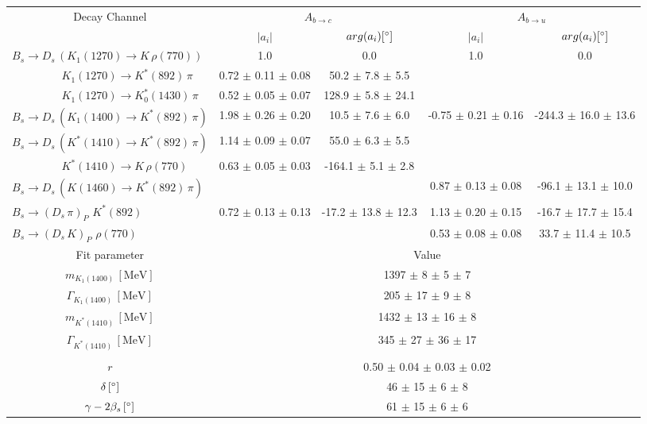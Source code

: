 \begin{tabular}{l c c c c } 
\hline
\hline
\multicolumn{1}{c}{Decay Channel} & \multicolumn{2}{c}{$A_{b \to c}$} & \multicolumn{2}{c}{$A_{b \to u}$}  \\ 
 & \multicolumn{1}{c}{$\vert a_i \vert$}  & \multicolumn{1}{c}{$arg(a_i) [^{\circ}]$}  & \multicolumn{1}{c}{$\vert a_i \vert$} & \multicolumn{1}{c}{$arg(a_i) [^{\circ}]$} \\ 
\hline
 $B_s \to D_s \, ( K_1(1270) \to K \, \rho(770) ) $ &  1.0 & 0.0 & 1.0 & 0.0  \\ 
$\phantom{B_s \to D_s \, (} K_1(1270) \to K^{*}(892) \, \pi \phantom{)} $ & 0.72 $\pm$ 0.11 $\pm$ 0.08 & 50.2 $\pm$ 7.8 $\pm$ 5.5 & &   \\ 
$\phantom{B_s \to D_s \, (} K_1(1270) \to K^{*}_{0}(1430) \, \pi \phantom{)} $ & 0.52 $\pm$ 0.05 $\pm$ 0.07 & 128.9 $\pm$ 5.8 $\pm$ 24.1 & &   \\ 
$B_s \to D_s \, ( K_1(1400) \to K^{*}(892) \, \pi ) $ & 1.98 $\pm$ 0.26 $\pm$ 0.20 & 10.5 $\pm$ 7.6 $\pm$ 6.0 & -0.75 $\pm$ 0.21 $\pm$ 0.16 & -244.3 $\pm$ 16.0 $\pm$ 13.6 \\ 
$B_s \to D_s \, ( K^{*}(1410) \to K^{*}(892) \, \pi ) $ & 1.14 $\pm$ 0.09 $\pm$ 0.07 & 55.0 $\pm$ 6.3 $\pm$ 5.5 &  &  \\ 
$\phantom{B_s \to D_s \, (} K^{*}(1410) \to K \, \rho(770) \phantom{)} $ & 0.63 $\pm$ 0.05 $\pm$ 0.03 & -164.1 $\pm$ 5.1 $\pm$ 2.8 & &   \\ 
$B_s \to D_s \, ( K(1460) \to K^{*}(892) \, \pi ) $ & & &0.87 $\pm$ 0.13 $\pm$ 0.08 & -96.1 $\pm$ 13.1 $\pm$ 10.0 \\ 
$B_s \to ( D_s \, \pi)_{P} \, \, K^{*}(892) $ & 0.72 $\pm$ 0.13 $\pm$ 0.13 & -17.2 $\pm$ 13.8 $\pm$ 12.3 & 1.13 $\pm$ 0.20 $\pm$ 0.15 & -16.7 $\pm$ 17.7 $\pm$ 15.4 \\ 
$B_s \to ( D_s \, K)_{P} \, \, \rho(770) $ & & &0.53 $\pm$ 0.08 $\pm$ 0.08 & 33.7 $\pm$ 11.4 $\pm$ 10.5 \\ 
\hline
\hline
\multicolumn{1}{c}{Fit parameter} & \multicolumn{4}{c}{Value}  \\ 
\hline
\multicolumn{1}{c}{$m_{K_1(1400)} \, [\text{MeV}]$} & \multicolumn{4}{c}{1397 $\pm$ 8 $\pm$ 5 $\pm$ 7} \\ 
\multicolumn{1}{c}{$\Gamma_{K_1(1400)} \, [\text{MeV}]$} & \multicolumn{4}{c}{205 $\pm$ 17 $\pm$ 9 $\pm$ 8} \\ 
\multicolumn{1}{c}{$m_{K^{*}(1410)} \, [\text{MeV}]$} & \multicolumn{4}{c}{1432 $\pm$ 13 $\pm$ 16 $\pm$ 8} \\ 
\multicolumn{1}{c}{$\Gamma_{K^{*}(1410)} \, [\text{MeV}]$} & \multicolumn{4}{c}{345 $\pm$ 27 $\pm$ 36 $\pm$ 17} \\ 
 \\ 
\multicolumn{1}{c}{$r$} & \multicolumn{4}{c}{0.50 $\pm$ 0.04 $\pm$ 0.03 $\pm$ 0.02} \\ 
\multicolumn{1}{c}{$\delta \, [^{\circ}]$} & \multicolumn{4}{c}{46 $\pm$ 15 $\pm$ 6 $\pm$ 8} \\ 
\multicolumn{1}{c}{$\gamma - 2 \beta_{s} \, [^{\circ}]$} & \multicolumn{4}{c}{61 $\pm$ 15 $\pm$ 6 $\pm$ 6} \\ 
\hline
\hline
\end{tabular}
